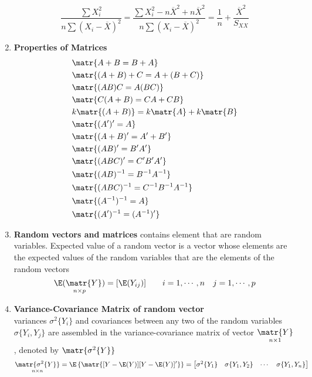 \documentclass[11pt]{article}
\begin{document}
\begin{defn*}
\begin{enumerate}
\[            \frac{\sum X_i^2}{n \sum (X_i - \overline{X})^2} =
            \frac{\sum X_i^2 - n\overline{X}^2 + n\overline{X}^2}{n\sum (X_i - \overline{X})^2} = 
            \frac{1}{n} + \frac{\overline{X}^2}{S_{XX}}
        \]
        \item \textbf{Properties of Matrices}
        \begin{align*}
            &\matr{A + B = B + A} \\
            &\matr{(A+B)+C = A + (B+C)} \\
            &\matr{(AB)C = A(BC)} \\
            &\matr{C(A+B) = CA + CB} \\
            &k\matr{(A+B)} = k\matr{A} + k\matr{B} \\
            &\matr{(A')' = A} \\
            &\matr{(A+B)' = A' + B'} \\
            &\matr{(AB)' = B'A'} \\
            &\matr{(ABC)' = C'B'A'} \\
            &\matr{(AB)^{-1} = B^{-1}A^{-1}} \\
            &\matr{(ABC)^{-1} = C^{-1}B^{-1}A^{-1}} \\
            &\matr{(A^{-1})^{-1} = A} \\
            &\matr{(A')^{-1} = (A^{-1})'} \\ 
        \end{align*}
        \item \textbf{Random vectors and matrices} contains element that are random variables. Expected value of a random vector is a vector whose elements are the expected values of the random variables that are the elements of the random vectors 
        \[
            \underset{n\times p}{\E(\matr{Y})} = [ \E(Y_{ij}) ] \quad \quad i = 1,\cdots, n \quad j = 1, \cdots, p
        \]
        \item \textbf{Variance-Covariance Matrix of random vector} \\
        variances $\sigma^2\{ Y_i \}$ and covariances between any two of the random variables $\sigma\{ Y_i, Y_j\}$ are assembled in the variance-covariance matrix of vector $\underset{n\times 1}{\matr{Y}}$, denoted by $\matr{\sigma^2\{Y\}}$
        \[
            \underset{n\times n}{\matr{\sigma^2\{ Y \}}} =
            \E\left\{ \matr{[Y - \E(Y)][Y - \E(Y)]'} \right\} = 
            \begin{bmatrix}
                \sigma^2\{Y_1 \} & \sigma\{ Y_1, Y_2 \} & \cdots & \sigma\{ Y_1, Y_n \} \\

\end{bmatrix}\]
\end{enumerate}
\end{defn*}
\end{document}

